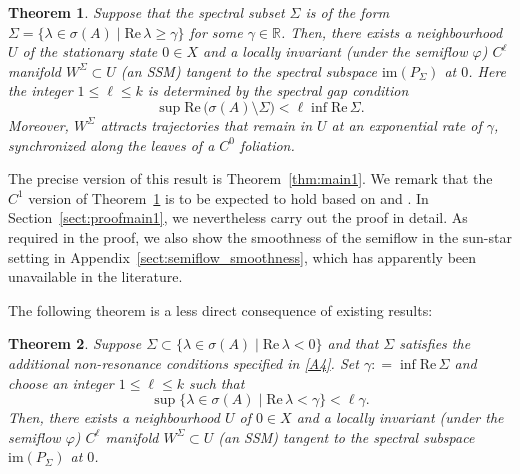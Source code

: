 \documentclass[a4paper, 12pt, oneside, reqno, notitlepage]{amsart}
\theoremstyle{plain}
\newtheorem{theorem}{Theorem}
\theoremstyle{definition}
\theoremstyle{remark}
\newcommand{\im}{\mathrm{im}}
\begin{document}
\begin{theorem} \label{thm:intro}
    Suppose that the spectral subset $\Sigma$ is of the form $ \Sigma = \{\lambda \in \sigma(A) \; | \; \mathrm{Re } \, \lambda \geq \gamma\}$ for some $\gamma \in \mathbb{R}$.
    Then, there exists a neighbourhood $U$ of the stationary state $0 \in X$ and a locally invariant (under the semiflow $\varphi$) $C^\ell$ manifold $W^\Sigma \subset U$ (an SSM) tangent to the spectral subspace $ \im(P_\Sigma)$ at $0$.
    Here the integer $1 \leq \ell \leq k$ is determined by the spectral gap condition 
    \begin{displaymath}
        \sup\mathrm{Re} \, \big( \sigma(A) \setminus \Sigma \big) <\ell \inf \mathrm{Re} \, \Sigma.
    \end{displaymath}
    Moreover, $W^\Sigma$ attracts trajectories that remain in $U$ at an exponential rate of $\gamma$, synchronized along the leaves of a $C^0$ foliation.
\end{theorem}

The precise version of this result is Theorem~\ref{thm:main1}.
We remark that the $C^1$ version of Theorem~\ref{thm:intro} is to be expected to hold based on \cite{chen1997invariant} and \cite{diekmann2012delay}. 
In Section~\ref{sect:proofmain1}, we nevertheless carry out the proof in detail.
As required in the proof, we also show the smoothness of the semiflow in the sun-star setting in Appendix~\ref{sect:semiflow_smoothness}, which has apparently been unavailable in the literature.

The following theorem is a less direct consequence of existing results:

\begin{theorem} \label{thm:intro2}
    Suppose  $ \Sigma \subset \{\lambda \in \sigma(A) \; | \; \mathrm{Re } \, \lambda < 0\}$ and that $\Sigma$ satisfies the additional non-resonance conditions specified in \ref{A4}.
    Set $\gamma : = \inf \mathrm{Re} \, \Sigma$ and choose an integer $1 \leq \ell \leq k$ such that 
    \begin{displaymath}
        \sup \{ \lambda \in \sigma(A) \; | \; \mathrm{Re} \, \lambda < \gamma \} < \ell \gamma.
    \end{displaymath}
    Then, there exists a neighbourhood $U$ of $0 \in X$ and a locally invariant (under the semiflow $\varphi$) $C^\ell$ manifold $W^\Sigma \subset U$ (an SSM) tangent to the spectral subspace $ \im(P_\Sigma)$ at $0$.
\end{theorem}
\end{document}
